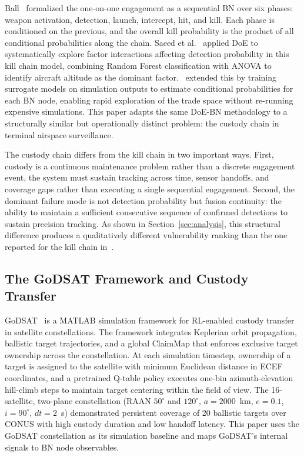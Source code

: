 \documentclass[]{spie}
\begin{document}
Ball~\cite{Ball2003} formalized the one-on-one engagement as a sequential BN over six phases: weapon activation, detection, launch, intercept, hit, and kill. Each phase is conditioned on the previous, and the overall kill probability is the product of all conditional probabilities along the chain. Saeed et al.~\cite{Saeed2025DOEFramework} applied DoE to systematically explore factor interactions affecting detection probability in this kill chain model, combining Random Forest classification with ANOVA to identify aircraft altitude as the dominant factor.~\cite{Saeed2025BNDOE} extended this by training surrogate models on simulation outputs to estimate conditional probabilities for each BN node, enabling rapid exploration of the trade space without re-running expensive simulations. This paper adapts the same DoE-BN methodology to a structurally similar but operationally distinct problem: the custody chain in terminal airspace surveillance.

The custody chain differs from the kill chain in two important ways. First, custody is a continuous maintenance problem rather than a discrete engagement event, the system must sustain tracking across time, sensor handoffs, and coverage gaps rather than executing a single sequential engagement. Second, the dominant failure mode is not detection probability but fusion continuity: the ability to maintain a sufficient consecutive sequence of confirmed detections to sustain precision tracking. As shown in Section~\ref{sec:analysis}, this structural difference produces a qualitatively different vulnerability ranking than the one reported for the kill chain in~\cite{Saeed2025DOEFramework}.

\subsection{The GoDSAT Framework and Custody Transfer}
\label{sec:godsat_background}

GoDSAT~\cite{Saeed2026GoDSATRL} is a MATLAB simulation framework for RL-enabled custody transfer in satellite constellations. The framework integrates Keplerian orbit propagation, ballistic target trajectories, and a global ClaimMap that enforces exclusive target ownership across the constellation. At each simulation timestep, ownership of a target is assigned to the satellite with minimum Euclidean distance in ECEF coordinates, and a pretrained Q-table policy executes one-bin azimuth-elevation hill-climb steps to maintain target centering within the field of view. The 16-satellite, two-plane constellation (RAAN $50^\circ$ and $120^\circ$, $a = 2000$~km, $e = 0.1$, $i = 90^\circ$, $dt = 2$~s) demonstrated persistent coverage of 20 ballistic targets over CONUS with high custody duration and low handoff latency. This paper uses the GoDSAT constellation as its simulation baseline and maps GoDSAT's internal signals to BN node observables.
\end{document}
